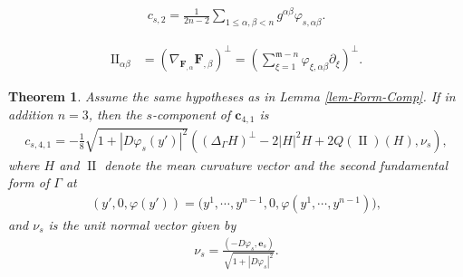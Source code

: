 \documentclass[10pt,a4paper]{amsart}
\newtheorem{theorem}{Theorem}
\newcommand{\fm}{\mathfrak{m}}
\renewcommand{\leq}{\leqslant}
\begin{document}
\begin{align}\label{eq-c2-local}
    c_{s,2} =\frac{1}{2n-2}\sum_{1\leq \alpha,\beta<n}g^{\alpha\beta} \varphi_{s,\alpha \beta}. 
\end{align}

\begin{align}\label{eq-II}
\mathrm{II}_{\alpha \beta} &= \left(\nabla_{\mathbf{F}_{,\alpha}}\mathbf{F}_{,\beta}\right)^\perp = \left(\sum_{\xi=1}^{\fm-n} \varphi_{\xi, \alpha\beta}\partial_{\xi}\right)^\perp.
\end{align}

\begin{theorem}\label{thm-c41}
Assume the same hypotheses as in Lemma \ref{lem-Form-Comp}. If in addition $n=3$, then the $s$-component of $\mathbf{c}_{4,1}$ is
\begin{align}\label{eq-c-41}
c_{s, 4,1} = -\frac{1}{8}\sqrt{1+|D\varphi_s(y')|^2} \left( (\Delta_\Gamma H)^\perp-2|H|^2 H + 2Q(\operatorname{II})(H), \nu_s \right),
\end{align}
where $H$ and $\operatorname{II}$ denote the mean curvature vector and the second fundamental form of $\Gamma$ at
\begin{align}
(y', 0, \varphi(y')) = \bigl(y^1,\cdots, y^{n-1}, 0, \varphi(y^1,\cdots, y^{n-1})\bigr),
\end{align}
and $\nu_s$ is the unit normal vector given by
\begin{align}
\nu_s = \frac{(-D\varphi_s, \mathbf{e}_s)}{\sqrt{1+|D \varphi_s|^2}}.
\end{align}
\end{theorem}
\end{document}
